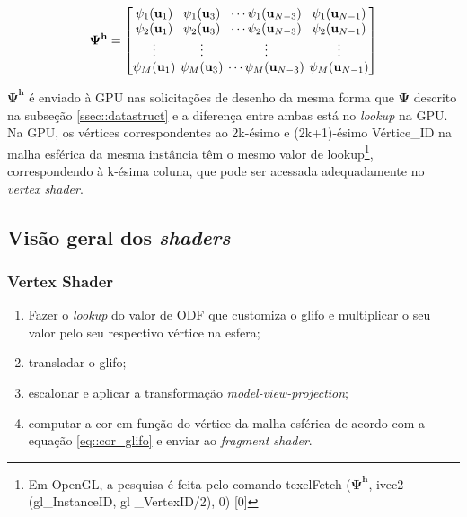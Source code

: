 \documentclass[
    12pt,                %
    oneside,            %
    a4paper,            %
    english,            %
    french,                %
    spanish,            %
    brazil                %
    ]{abntex2}
\begin{document}
\begin{equation}
\label{eq::Psi_changed}
\mathbf{\Psi^h} = 
\begingroup %
\setlength\arraycolsep{2pt}
\begin{bmatrix} 
    \psi_1(\mathbf{u}_1) & \psi_1(\mathbf{u}_3) & \cdots \psi_1(\mathbf{u}_{N-3}) & \psi_1(\mathbf{u}_{N-1})  \\
    
     \psi_2(\mathbf{u}_1)& \psi_2(\mathbf{u}_3) & \cdots \psi_2(\mathbf{u}_{N-3}) & \psi_2(\mathbf{u}_{N-1}) \\

    \vdots & \vdots & \vdots & \vdots  \\
    
     \psi_M(\mathbf{u}_1)&\psi_M(\mathbf{u}_3) & \cdots \psi_M(\mathbf{u}_{N-3}) & \psi_M(\mathbf{u}_{N-1})
    
\end{bmatrix}
\endgroup
\end{equation}


$\mathbf{\Psi^h}$ é enviado à GPU nas solicitações de desenho da mesma forma que $\mathbf{\Psi}$ descrito na subseção \ref{ssec::datastruct} e a diferença entre ambas está no \textit{lookup} na GPU. Na GPU, os vértices correspondentes ao 2k-ésimo e (2k+1)-ésimo Vértice\_ID na malha esférica da mesma instância têm o mesmo valor de lookup\footnote{Em OpenGL, a pesquisa é feita pelo comando texelFetch ($\mathbf{\Psi^h} $, ivec2 (gl\_InstanceID, gl \_VertexID/2), 0) [0]}, correspondendo à k-ésima coluna, que pode ser acessada adequadamente no \textit{vertex shader}.



\subsection{Visão geral dos \textit{shaders}}

\label{sssec::visao_shaders}

\subsubsection{Vertex Shader}
\begin{enumerate}
    \item Fazer o \textit{lookup} do valor de ODF que customiza o glifo e multiplicar o seu valor pelo seu respectivo vértice na esfera;
    \item transladar o glifo;
    \item escalonar e aplicar a transformação \textit{model-view-projection};
    \item computar a cor em função do vértice da malha esférica de acordo com a equação \ref{eq::cor_glifo} e enviar ao \textit{fragment shader}.
\end{enumerate}
\end{document}
